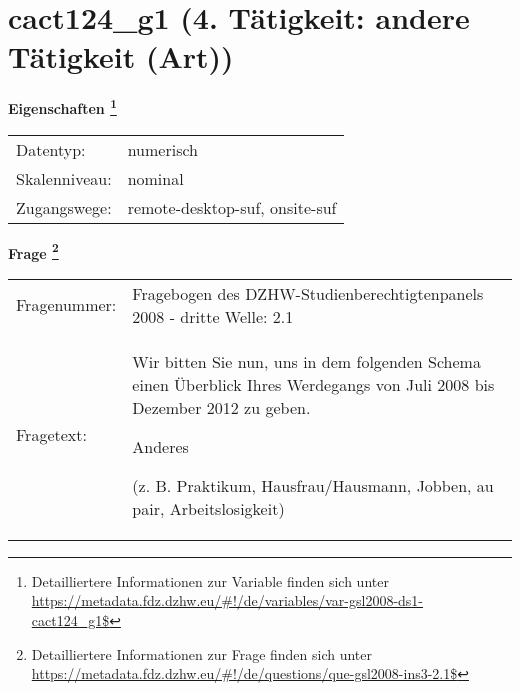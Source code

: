 
    \setcounter{footnote}{0}

    \vspace*{-1.8cm}
	\section{cact124\_g1 (4. Tätigkeit: andere Tätigkeit (Art))}
	\label{section:cact124_g1}



    \vspace*{0.5cm}
    \noindent\textbf{Eigenschaften
	\footnote{Detailliertere Informationen zur Variable finden sich unter
		\url{https://metadata.fdz.dzhw.eu/\#!/de/variables/var-gsl2008-ds1-cact124_g1$}}}\\
	\begin{tabularx}{\hsize}{@{}lX}
	Datentyp: & numerisch \\
	Skalenniveau: & nominal \\
	Zugangswege: &
	  remote-desktop-suf, 
	  onsite-suf
 \\
    \end{tabularx}



				\vspace*{0.5cm}
                \noindent\textbf{Frage
	                \footnote{Detailliertere Informationen zur Frage finden sich unter
		              \url{https://metadata.fdz.dzhw.eu/\#!/de/questions/que-gsl2008-ins3-2.1$}}}\\
				\begin{tabularx}{\hsize}{@{}lX}
					Fragenummer: &
					  Fragebogen des DZHW-Studienberechtigtenpanels 2008 - dritte Welle:
					  2.1
 \\
					Fragetext: & Wir bitten Sie nun, uns in dem folgenden Schema einen Überblick Ihres Werdegangs von Juli 2008 bis Dezember 2012 zu geben.\par  Anderes\par  (z. B. Praktikum, Hausfrau/Hausmann, Jobben, au pair, Arbeitslosigkeit) \\
				\end{tabularx}





